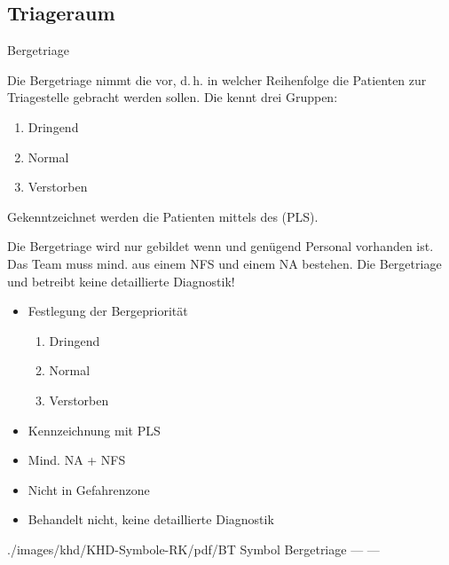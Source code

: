 {\begin{Parallel}
{%

\cite{RkRahmenvorschriftGrossunfaelle2007}
\cite{RkPlsNeu2008}
}
\end{Parallel}
}%





\clearpage
\subsection{Triageraum}



\TextSlideTeaser
{Bergetriage}%
{%
Die Bergetriage nimmt die  vor,
d.\,h. in welcher Reihenfolge die Patienten zur Triagestelle
gebracht werden sollen. 
Die  kennt drei Gruppen:
\begin{enumerate} 
  \item Dringend
  \item Normal
  \item Verstorben
\end{enumerate} 
Gekenntzeichnet werden die Patienten mittels des
 (PLS).

Die Bergetriage wird nur gebildet wenn  und genügend Personal vorhanden ist.
Das Team muss mind. aus einem NFS und einem NA bestehen. 
Die Bergetriage  und betreibt keine
detaillierte Diagnostik!}%
{
\begin{itemize}
  \item Festlegung der Bergepriorität
  \begin{enumerate} 
    \item Dringend
    \item Normal
    \item Verstorben
  \end{enumerate} 
  \item Kennzeichnung mit PLS
  \item Mind. NA + NFS
  \item Nicht in Gefahrenzone
  \item Behandelt nicht, keine detaillierte Diagnostik
\end{itemize}}%
{./images/khd/KHD-Symbole-RK/pdf/BT}%
{Symbol Bergetriage}%
{}%
{---}%
{---}%



